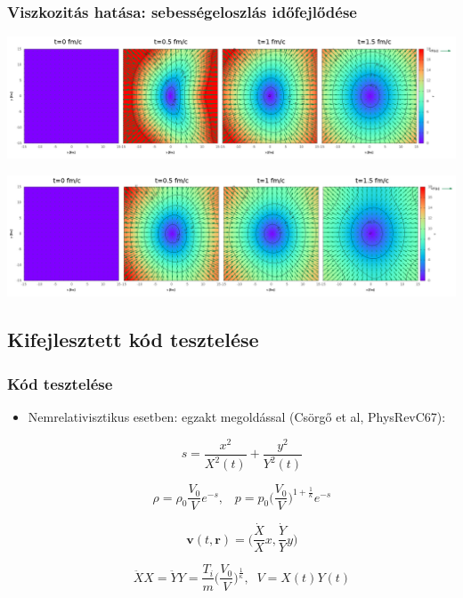 \documentclass{beamer}
\begin{document}
\begin{frame}[noframenumbering]
\frametitle{Viszkozitás hatása:  sebességeloszlás időfejlődése}
\begin{minipage}{0.04\textwidth}
\end{minipage}
\begin{minipage}{0.95\textwidth}
\begin{center}
    \includegraphics[scale=0.15]{pic/res/nonrel/anim/vv0}

    \includegraphics[scale=0.15]{pic/res/nonrel/anim/vv10}
\end{center}
\end{minipage}
\end{frame}



\subsection{Kifejlesztett kód tesztelése}
\begin{frame}[noframenumbering]
\frametitle{Kód tesztelése}
\begin{itemize}
  \setlength{\itemsep}{5pt}
\item<1| only@1> Nemrelativisztikus esetben: egzakt megoldással (Csörgő et al, PhysRevC67):

\begin{equation*}
s=\frac{x^2}{X^2(t)}+\frac{y^2}{Y^2(t)}
\end{equation*}

\begin{equation*}
\rho = \rho_0\frac{V_0}{V}e^{-s},\;\;\; p=p_0\bigg(\frac{V_0}{V}\bigg)^{1+\frac{1}{\kappa}}e^{-s}
\end{equation*}

\begin{equation*}
\bm{v}(t, \bm{r})=\bigg(\frac{\dot{X}}{X}x, \frac{\dot{Y}}{Y}y\bigg)
\end{equation*}

\begin{equation*}
\ddot{X}X=\ddot{Y}Y=\frac{T_i}{m}\bigg(\frac{V_0}{V}\bigg)^{\frac{1}{\kappa}},\;\;V=X(t)Y(t)
\end{equation*}
\end{itemize}
\end{frame}
\end{document}
